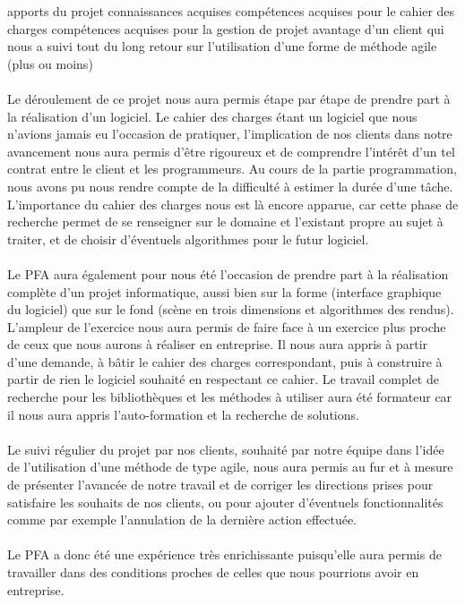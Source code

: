 apports du projet
connaissances acquises
compétences acquises pour le cahier des charges
compétences acquises pour la gestion de projet
avantage d'un client qui nous a suivi tout du long
retour sur l'utilisation d'une forme de méthode agile (plus ou moins)


\paragraph{}
Le déroulement de ce projet nous aura permis étape par étape de prendre part à la réalisation d'un logiciel. Le cahier des charges étant un logiciel que nous n'avions jamais eu l'occasion de pratiquer, l'implication de nos clients dans notre avancement nous aura permis d'être rigoureux et de comprendre l'intérêt d'un tel contrat entre le client et les programmeurs.
Au cours de la partie programmation, nous avons pu nous rendre compte de la difficulté à estimer la durée d'une tâche. L'importance du cahier des charges nous est là encore apparue, car cette phase de recherche permet de se renseigner sur le domaine et l'existant propre au sujet à traiter, et de choisir d'éventuels algorithmes pour le futur logiciel.

\paragraph{}
Le PFA aura également pour nous été l'occasion de prendre part à la réalisation complète d'un projet informatique, aussi bien sur la forme (interface graphique du logiciel) que sur le fond (scène en trois dimensions et algorithmes des rendus). L'ampleur de l'exercice nous aura permis de faire face à un exercice plus proche de ceux que nous aurons à réaliser en entreprise. Il nous aura appris à partir d'une demande, à bâtir le cahier des charges correspondant, puis à construire à partir de rien le logiciel souhaité en respectant ce cahier. Le travail complet de recherche pour les bibliothèques et les méthodes à utiliser aura été formateur car il nous aura appris l'auto-formation et la recherche de solutions.

\paragraph{}
Le suivi régulier du projet par nos clients, souhaité par notre équipe dans l'idée de l'utilisation d'une méthode de type agile, nous aura permis au fur et à mesure de présenter l'avancée de notre travail et de corriger les directions prises pour satisfaire les souhaits de nos clients, ou pour ajouter d'éventuels fonctionnalités comme par exemple l'annulation de la dernière action effectuée.

\paragraph{}
Le PFA a donc été une expérience très enrichissante puisqu'elle aura permis de travailler dans des conditions proches de celles que nous pourrions avoir en entreprise.

